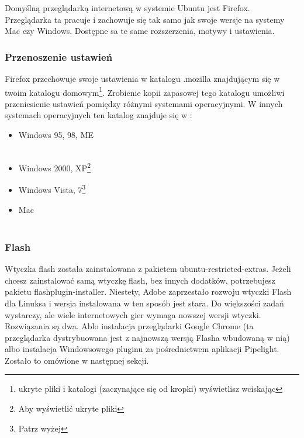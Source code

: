 Domyślną przeglądarką internetową w systemie Ubuntu jest Firefox. Przeglądarka ta pracuje i zachowuje się tak samo jak swoje wersje na systemy Mac czy Windows. Dostępne sa te same rozszerzenia, motywy i ustawienia.

\subsubsection{Przenoszenie ustawień}
Firefox przechowuje swoje ustawienia w katalogu .mozilla znajdującym się w twoim katalogu domowym\footnote{ukryte pliki i katalogi (zaczynające się od kropki) wyświetlisz wciskając }. Zrobienie kopii zapasowej tego katalogu umożliwi przeniesienie ustawień pomiędzy różnymi systemami operacyjnymi. W innych systemach operacyjnych ten katalog znajduje się w :
\begin{itemize}
\item Windows 95, 98, ME\\
\\
\item Windows 2000, XP\footnote{Aby wyświetlić ukryte pliki }\\
\item Windows Vista, 7\footnote{Patrz wyżej}\\
\item Mac\\
\\
\end{itemize}

\subsubsection{Flash}
Wtyczka flash została zainstalowana z pakietem \textcolor{ubuntu_orange}{ubuntu-restricted-extras}. Jeżeli chcesz zainstalować samą wtyczkę flash, bez innych dodatków, potrzebujesz pakietu \textcolor{ubuntu_orange}{flashplugin-installer}. Niestety, Adobe zaprzestało rozwoju wtyczki Flash dla Linuksa i wersja instalowana w ten sposób jest stara. Do większości zadań wystarczy, ale wiele internetowych gier wymaga nowszej wersji wtyczki. Rozwiązania są dwa. Ablo instalacja przeglądarki Google Chrome (ta przeglądarka dystrybuowana jest z najnowszą wersją Flasha wbudowaną w nią) albo instalacja Windowsowego pluginu za pośrednictwem aplikacji Pipelight. Zostało to omówione w następnej sekcji.

